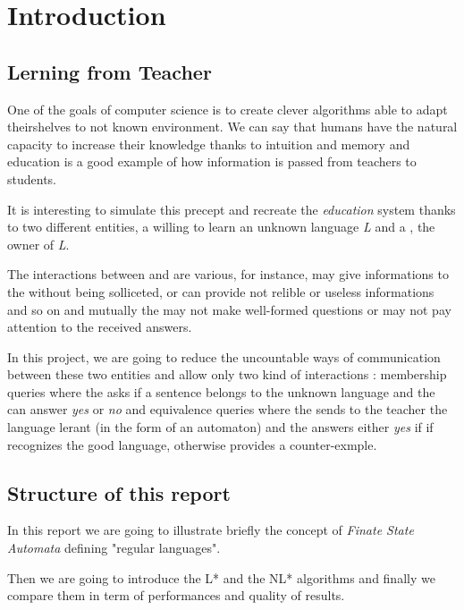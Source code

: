 \section{Introduction}

\subsection{Lerning from Teacher}


One of the goals of computer science is to create clever algorithms able to adapt theirshelves to not known environment. We can say that humans have the natural capacity to increase their knowledge thanks to intuition and memory and education is a good example of how information is passed from teachers to students.

It is interesting to simulate this precept and recreate the \textit{education} system thanks to two different entities, a \lerner{} willing to learn an unknown language \textit{L} and a \teacher{}, the owner of \textit{L}.

The interactions between \lerner{} and \teacher{} are various, for instance, \teacher{} may give informations to the \lerner{} without being solliceted, or can provide not relible or useless informations and so on and mutually the \lerner{} may not make well-formed questions or may not pay attention to the received answers.

In this project, we are going to reduce the uncountable ways of communication between these two entities and allow only two kind of interactions : membership queries where the \lerner{} asks if a sentence belongs to the unknown language and the \teacher{} can answer \textit{yes} or \textit{no} and
equivalence queries where the \lerner{} sends to the teacher the language lerant (in the form of an automaton) and the \teacher{} answers either \textit{yes} if if recognizes the good language, otherwise provides a counter-exmple.

\subsection{Structure of this report}
In this report we are going to illustrate briefly the concept of \textit{Finate State Automata} defining "regular languages".

Then we are going to introduce the L* \cite{angluinL} and the NL* \cite{angluinNL} algorithms and finally we compare them in term of performances and quality of results.